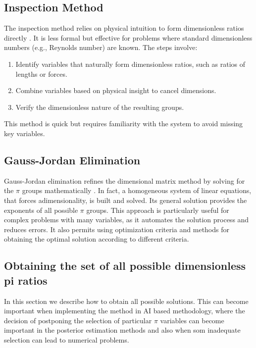 \documentclass[
	11pt, %
	fleqn, %
	a4paper, %
]{LegrandOrangeBook}
\begin{document}
\subsection{Inspection Method}
\label{subsec:inspection}

The inspection method relies on physical intuition to form dimensionless ratios directly \cite{white2011}. It is less formal but effective for problems where standard dimensionless numbers (e.g., Reynolds number) are known. The steps involve:
\begin{enumerate}
    \item Identify variables that naturally form dimensionless ratios, such as ratios of lengths or forces.
    \item Combine variables based on physical insight to cancel dimensions.
    \item Verify the dimensionless nature of the resulting groups.
\end{enumerate}
This method is quick but requires familiarity with the system to avoid missing key variables.

\subsection{Gauss-Jordan Elimination}
\label{subsec:gauss}

Gauss-Jordan elimination refines the dimensional matrix method by solving for the $\pi$ groups mathematically \cite{Sonin2004}. In fact, a homogeneous system of linear equations, that forces adimensionality, is built and solved. Its general solution provides the exponents of all possible $\pi$ groups. This approach is particularly useful for complex problems with many variables, as it automates the solution process and reduces errors. It also permits using optimization criteria and methods for obtaining the optimal solution according to different criteria.

\subsection{Obtaining the set of all possible dimensionless pi ratios}
In this section we describe how to obtain all possible solutions. This can become important when implementing the method in AI based methodology, where the decision of postponing the selection of particular $\pi$ variables can become important in the posterior estimation methods and also when som inadequate selection can lead to numerical problems.
\end{document}
